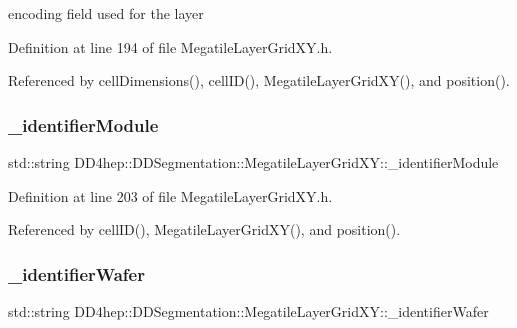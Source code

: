 encoding field used for the layer 



Definition at line 194 of file Megatile\+Layer\+Grid\+X\+Y.\+h.



Referenced by cell\+Dimensions(), cell\+I\+D(), Megatile\+Layer\+Grid\+X\+Y(), and position().

\hypertarget{class_d_d4hep_1_1_d_d_segmentation_1_1_megatile_layer_grid_x_y_ac694e7f1d8e601f1893f84fb8bb6286f}{}\label{class_d_d4hep_1_1_d_d_segmentation_1_1_megatile_layer_grid_x_y_ac694e7f1d8e601f1893f84fb8bb6286f} 
\subsubsection{\texorpdfstring{\+\_\+identifier\+Module}{\_identifierModule}}
{\footnotesize\ttfamily std\+::string D\+D4hep\+::\+D\+D\+Segmentation\+::\+Megatile\+Layer\+Grid\+X\+Y\+::\+\_\+identifier\+Module\hspace{0.3cm}{\ttfamily [protected]}}



Definition at line 203 of file Megatile\+Layer\+Grid\+X\+Y.\+h.



Referenced by cell\+I\+D(), Megatile\+Layer\+Grid\+X\+Y(), and position().

\hypertarget{class_d_d4hep_1_1_d_d_segmentation_1_1_megatile_layer_grid_x_y_a97bf5f24b4c9a44f74ae5c245c13c824}{}\label{class_d_d4hep_1_1_d_d_segmentation_1_1_megatile_layer_grid_x_y_a97bf5f24b4c9a44f74ae5c245c13c824} 
\subsubsection{\texorpdfstring{\+\_\+identifier\+Wafer}{\_identifierWafer}}
{\footnotesize\ttfamily std\+::string D\+D4hep\+::\+D\+D\+Segmentation\+::\+Megatile\+Layer\+Grid\+X\+Y\+::\+\_\+identifier\+Wafer\hspace{0.3cm}{\ttfamily [protected]}}



